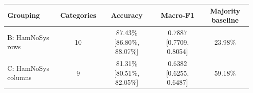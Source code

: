 \begin{tabular}{lcccc}
\toprule
\textbf{Grouping} & \textbf{Categories} & \textbf{Accuracy} & \textbf{Macro-F1} & \textbf{Majority baseline} \\
\midrule
B: HamNoSys rows & 10 & 87.43\% [86.80\%, 88.07\%] & 0.7887 [0.7709, 0.8054] & 23.98\% \\
C: HamNoSys columns & 9 & 81.31\% [80.51\%, 82.05\%] & 0.6382 [0.6255, 0.6487] & 59.18\% \\
\bottomrule
\end{tabular}
